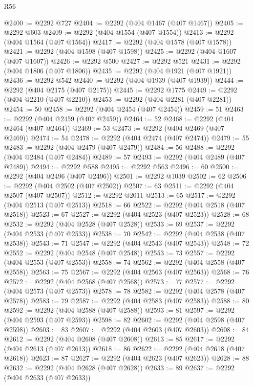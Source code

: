 \begin{lexlean}{R56}
\begin{coremodule}
@2400 := @2292 @727
@2404 := @2292 (@404 @1467 (@407 @1467))
@2405 := @2292 @603
@2409 := @2292 (@404 @1554 (@407 @1554))
@2413 := @2292 (@404 @1564 (@407 @1564))
@2417 := @2292 (@404 @1578 (@407 @1578))
@2421 := @2292 (@404 @1598 (@407 @1598))
@2425 := @2292 (@404 @1607 (@407 @1607))
@2426 := @2292 @500
@2427 := @2292 @521
@2431 := @2292 (@404 @1806 (@407 @1806))
@2435 := @2292 (@404 @1921 (@407 @1921))
@2436 := @2292 @542
@2440 := @2292 (@404 @1939 (@407 @1939))
@2444 := @2292 (@404 @2175 (@407 @2175))
@2445 := @2292 @1775
@2449 := @2292 (@404 @2210 (@407 @2210))
@2453 := @2292 (@404 @2281 (@407 @2281))
@2454 := 50
@2458 := @2292 (@404 @2454 (@407 @2454))
@2459 := 51
@2463 := @2292 (@404 @2459 (@407 @2459))
@2464 := 52
@2468 := @2292 (@404 @2464 (@407 @2464))
@2469 := 53
@2473 := @2292 (@404 @2469 (@407 @2469))
@2474 := 54
@2478 := @2292 (@404 @2474 (@407 @2474))
@2479 := 55
@2483 := @2292 (@404 @2479 (@407 @2479))
@2484 := 56
@2488 := @2292 (@404 @2484 (@407 @2484))
@2489 := 57
@2493 := @2292 (@404 @2489 (@407 @2489))
@2494 := @2292 @588
@2495 := @2292 @563
@2496 := 60
@2500 := @2292 (@404 @2496 (@407 @2496))
@2501 := @2292 @1039
@2502 := 62
@2506 := @2292 (@404 @2502 (@407 @2502))
@2507 := 63
@2511 := @2292 (@404 @2507 (@407 @2507))
@2512 := @2292 @2011
@2513 := 65
@2517 := @2292 (@404 @2513 (@407 @2513))
@2518 := 66
@2522 := @2292 (@404 @2518 (@407 @2518))
@2523 := 67
@2527 := @2292 (@404 @2523 (@407 @2523))
@2528 := 68
@2532 := @2292 (@404 @2528 (@407 @2528))
@2533 := 69
@2537 := @2292 (@404 @2533 (@407 @2533))
@2538 := 70
@2542 := @2292 (@404 @2538 (@407 @2538))
@2543 := 71
@2547 := @2292 (@404 @2543 (@407 @2543))
@2548 := 72
@2552 := @2292 (@404 @2548 (@407 @2548))
@2553 := 73
@2557 := @2292 (@404 @2553 (@407 @2553))
@2558 := 74
@2562 := @2292 (@404 @2558 (@407 @2558))
@2563 := 75
@2567 := @2292 (@404 @2563 (@407 @2563))
@2568 := 76
@2572 := @2292 (@404 @2568 (@407 @2568))
@2573 := 77
@2577 := @2292 (@404 @2573 (@407 @2573))
@2578 := 78
@2582 := @2292 (@404 @2578 (@407 @2578))
@2583 := 79
@2587 := @2292 (@404 @2583 (@407 @2583))
@2588 := 80
@2592 := @2292 (@404 @2588 (@407 @2588))
@2593 := 81
@2597 := @2292 (@404 @2593 (@407 @2593))
@2598 := 82
@2602 := @2292 (@404 @2598 (@407 @2598))
@2603 := 83
@2607 := @2292 (@404 @2603 (@407 @2603))
@2608 := 84
@2612 := @2292 (@404 @2608 (@407 @2608))
@2613 := 85
@2617 := @2292 (@404 @2613 (@407 @2613))
@2618 := 86
@2622 := @2292 (@404 @2618 (@407 @2618))
@2623 := 87
@2627 := @2292 (@404 @2623 (@407 @2623))
@2628 := 88
@2632 := @2292 (@404 @2628 (@407 @2628))
@2633 := 89
@2637 := @2292 (@404 @2633 (@407 @2633))

\end{coremodule}
\end{lexlean}
